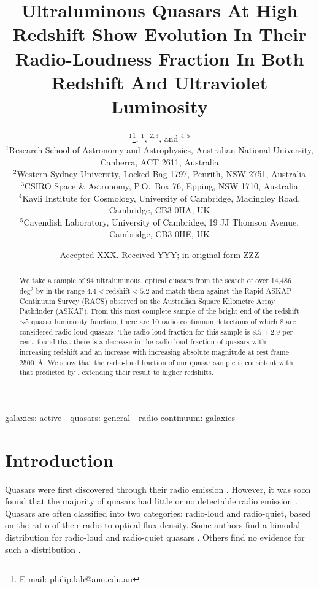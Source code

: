 \documentclass[a4paper,fleqn,usenatbib]{mnras}
\title[Ultraluminous Quasars At High Redshift Show Evolution In Their Radio-Loudness Fraction]{Ultraluminous Quasars At High Redshift Show Evolution In Their Radio-Loudness Fraction In Both Redshift And Ultraviolet Luminosity}
\author[Lah et al.]
{\orcid{Philip Lah}{0000-0001-6841-6553}$^{1}$\thanks{E-mail: philip.lah@anu.edu.au},
\orcid{Christopher A.~Onken}{0000-0003-0017-349X}$^{1}$, 
\orcid{Ray P.~Norris}{0000-0002-4597-1906}$^{2,3}$,
and \orcid{Francesco D'Eugenio}{0000-0003-2388-8172}$^{4,5}$\\
$^{1}$Research School of Astronomy and Astrophysics, Australian National University, Canberra, ACT 2611, Australia\\
$^{2}$Western Sydney University, Locked Bag 1797, Penrith, NSW 2751, Australia \\
$^{3}$CSIRO Space \& Astronomy, P.O.~Box 76, Epping, NSW 1710, Australia \\
$^{4}$Kavli Institute for Cosmology, University of Cambridge, Madingley Road, Cambridge, CB3 0HA, UK\\
$^{5}$Cavendish Laboratory, University of Cambridge, 19 JJ Thomson Avenue, Cambridge, CB3 0HE, UK\\
}
\date{Accepted XXX. Received YYY; in original form ZZZ}
\begin{document}
\label{firstpage}
\pagerange{\pageref{firstpage}--\pageref{lastpage}}
\maketitle


\begin{abstract}

{We take a sample of 94 ultraluminous, optical quasars from the search of over 14,486 deg$^2$ by \citet{onken22} in the range $4.4<$redshift$<5.2$ and match them against the Rapid ASKAP Continuum Survey (RACS) observed on the Australian Square Kilometre Array Pathfinder (ASKAP).  From this most complete sample of the bright end of the redshift $\sim 5$ quasar luminosity function, there are 10 radio continuum detections of which 8 are considered radio-loud quasars.  The radio-loud fraction for this sample is $8.5 \pm 2.9$ per cent.   \citet{jiang07} found that there is a decrease in {the} radio-loud fraction of quasars with increasing redshift and an increase with increasing absolute magnitude at rest frame 2500~\AA.  We show that the radio-loud fraction of our quasar sample is consistent with that predicted by \citet{jiang07}, extending their result to higher redshifts.}  

\end{abstract}


\begin{keywords}
galaxies: active - quasars: general - radio continuum: galaxies
\end{keywords}



\section{Introduction}

Quasars were first discovered through their radio emission \citep{matthews63,schmidt63}.  However, it was soon found that the majority of quasars had little or no detectable radio emission \citep{sandage65}.  Quasars are often classified into two categories: radio-loud and radio-quiet, based on the ratio of their radio to optical flux density.  Some authors find a bimodal distribution for radio-loud and radio-quiet quasars \citep{kellermann89,miller90,visnovsky92,goldschmidt99,ivezic02,ivezic04,white07}.  Others find no evidence for such a distribution \citep{cirasuolo03,lacy01,singal11,balokovic12,singal13,macfarlane21}.
\end{document}
